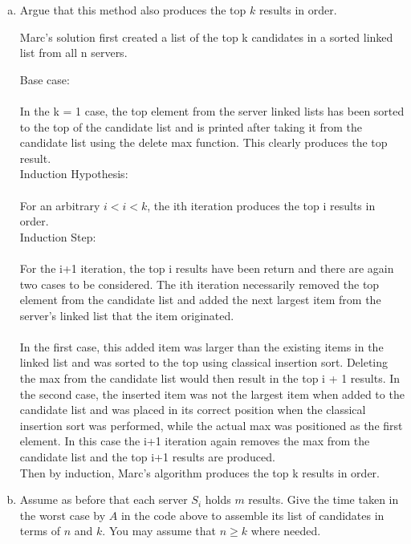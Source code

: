 \documentclass[12pt]{article}
\begin{document}
\begin{enumerate}[(a)]
\setcounter{enumi}{\value{saveenum}}
\item Argue that this method also produces the top $k$ results in order.

Marc's solution first created a list of the top k candidates in a sorted linked list from all n servers.

Base case:\\\\
In the k = 1 case, the top element from the server linked lists has been sorted to the top of the candidate list and is printed after taking it from the candidate list using the delete max function. This clearly produces the top result.\\

Induction Hypothesis:\\\\
For an arbitrary $i < i < k$, the ith iteration produces the top i results in order.\\

Induction Step:\\\\
For the i+1 iteration, the top i results have been return and there are again two cases to be considered. The ith iteration necessarily removed the top element from the candidate list and added the next largest item from the server's linked list that the item originated. \\\\In the first case, this added item was larger than the existing items in the linked list and was sorted to the top using classical insertion sort. Deleting the max from the candidate list would then result in the top i + 1 results. In the second case, the inserted item was not the largest item when added to the candidate list and was placed in its correct position when the classical insertion sort was performed, while the actual max was positioned as the first element. In this case the i+1 iteration again removes the max from the candidate list and the top i+1 results are produced.\\

Then by induction, Marc's algorithm produces the top k results in order.

\item Assume as before that each server $S_i$ holds $m$ results. Give the time taken in the worst
case by $A$ in the code above to assemble its list of candidates in terms of $n$ and $k$. You may assume that $n\geq k$ where needed.


\end{enumerate}
\end{document}
